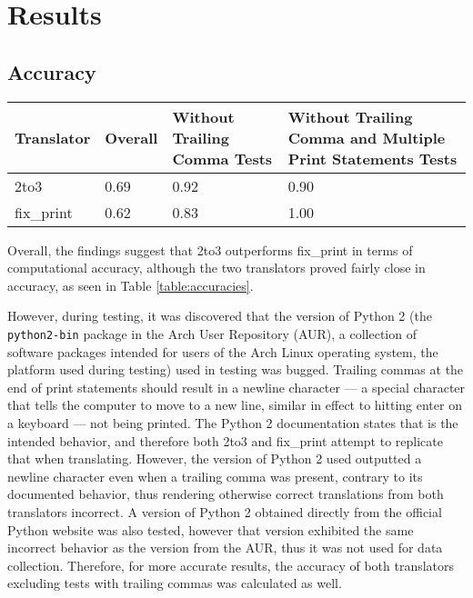 \section{Results}

\subsection{Accuracy}
\begin{table*}[hbt!]
    \centering
    \begin{tabular}{@{}l|lll@{}}
    \toprule
    Translator & Overall & Without Trailing Comma Tests & Without Trailing Comma and Multiple Print Statements Tests \\ \midrule
    2to3       & 0.69                         & 0.92                                      & 0.90                                                                             \\
    fix\_print & 0.62                          & 0.83                                      & 1.00                                                                               \\ \bottomrule
    \end{tabular}
    \caption{Computational accuracy of 2to3 and fix\_print.}
    \label{table:accuracies}
\end{table*}

Overall, the findings suggest that 2to3 outperforms fix\_print in terms of computational accuracy, although the two translators proved fairly close in accuracy, as seen in Table \ref{table:accuracies}.

However, during testing, it was discovered that the version of Python 2 (the \verb|python2-bin| package in the Arch User Repository (AUR), a collection of software packages intended for users of the Arch Linux operating system, the platform used during testing) used in testing was bugged. Trailing commas at the end of print statements should result in a newline character --- a special character that tells the computer to move to a new line, similar in effect to hitting enter on a keyboard --- not being printed. The Python 2 documentation states that is the intended behavior, and therefore both 2to3 and fix\_print attempt to replicate that when translating. However, the version of Python 2 used outputted a newline character even when a trailing comma was present, contrary to its documented behavior, thus rendering otherwise correct translations from both translators incorrect. A version of Python 2 obtained directly from the official Python website was also tested, however that version exhibited the same incorrect behavior as the version from the AUR, thus it was not used for data collection. Therefore, for more accurate results, the accuracy of both translators excluding tests with trailing commas was calculated as well.

